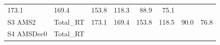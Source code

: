 \documentclass[]{article}
\begin{document}
\begin{longtable}[]{@{}llrrrrrr@{}}
\begin{minipage}[t]{0.09\columnwidth}
173.1\strut
\end{minipage} & \begin{minipage}[t]{0.09\columnwidth}\raggedleft\strut
169.4\strut
\end{minipage} & \begin{minipage}[t]{0.09\columnwidth}\raggedleft\strut
153.8\strut
\end{minipage} & \begin{minipage}[t]{0.09\columnwidth}\raggedleft\strut
118.3\strut
\end{minipage} & \begin{minipage}[t]{0.09\columnwidth}\raggedleft\strut
88.9\strut
\end{minipage} & \begin{minipage}[t]{0.09\columnwidth}\raggedleft\strut
75.1\strut
\end{minipage}\tabularnewline
\begin{minipage}[t]{0.14\columnwidth}\raggedright\strut
S3 AMS2\strut
\end{minipage} & \begin{minipage}[t]{0.13\columnwidth}\raggedright\strut
Total\_RT\strut
\end{minipage} & \begin{minipage}[t]{0.09\columnwidth}\raggedleft\strut
173.1\strut
\end{minipage} & \begin{minipage}[t]{0.09\columnwidth}\raggedleft\strut
169.4\strut
\end{minipage} & \begin{minipage}[t]{0.09\columnwidth}\raggedleft\strut
153.8\strut
\end{minipage} & \begin{minipage}[t]{0.09\columnwidth}\raggedleft\strut
118.5\strut
\end{minipage} & \begin{minipage}[t]{0.09\columnwidth}\raggedleft\strut
90.0\strut
\end{minipage} & \begin{minipage}[t]{0.09\columnwidth}\raggedleft\strut
76.8\strut
\end{minipage}\tabularnewline
\begin{minipage}[t]{0.14\columnwidth}\raggedright\strut
S4 AMSDec0\strut
\end{minipage} & \begin{minipage}[t]{0.13\columnwidth}\raggedright\strut
Total\_RT\strut
\end{minipage} & \begin{minipage}[t]{0.09\columnwidth}\raggedleft\strut

\end{minipage}
\end{longtable}
\end{document}
